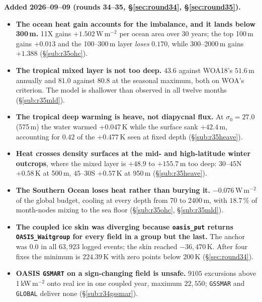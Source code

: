 \documentclass[10pt]{article}
\begin{document}
\textbf{Added 2026--09--09 (rounds 34--35, \S\ref{sec:round34}, \S\ref{sec:round35}).}
\begin{itemize}\itemsep2pt
\item \textbf{The ocean heat gain accounts for the imbalance, and it lands below 300\,m.}
11X gains $+1.502$\,W\,m$^{-2}$ per ocean area over 30 years; the top 100\,m gains
$+0.013$ and the 100--300\,m layer \emph{loses} $0.170$, while 300--2000\,m gains
$+1.388$ (\S\ref{sub:r35ohc}).
\item \textbf{The tropical mixed layer is not too deep.} $43.6$ against WOA18's $51.6$\,m
annually and $81.0$ against $80.8$ at the seasonal maximum, both on WOA's criterion. The
model is shallower than observed in all twelve months (\S\ref{sub:r35mld}).
\item \textbf{The tropical deep warming is heave, not diapycnal flux.} At $\sigma_0=27.0$
(575\,m) the water warmed $+0.047$\,K while the surface sank $+42.4$\,m, accounting for
$0.42$ of the $+0.477$\,K seen at fixed depth (\S\ref{sub:r35heave}).
\item \textbf{Heat crosses density surfaces at the mid- and high-latitude winter
outcrops}, where the mixed layer is $+48.9$ to $+155.7$\,m too deep: $30$--$45$N
$+0.58$\,K at 500\,m, $45$--$30$S $+0.57$\,K at 950\,m (\S\ref{sub:r35heave}).
\item \textbf{The Southern Ocean loses heat rather than burying it.} $-0.076$\,W\,m$^{-2}$
of the global budget, cooling at every depth from 70 to 2400\,m, with $18.7\,\%$ of
month-nodes mixing to the sea floor (\S\ref{sub:r35ohc}, \S\ref{sub:r35mld}).
\item \textbf{The coupled ice skin was diverging because \texttt{oasis\_put} returns
\texttt{OASIS\_Waitgroup} for every field in a group but the last.} The anchor was 0.0 in
all $63{,}923$ logged events; the skin reached $-36{,}470$\,K. After four fixes the
minimum is $224.39$\,K with zero points below 200\,K (\S\ref{sec:round34}).
\item \textbf{OASIS \texttt{GSMART} on a sign-changing field is unsafe.} $9105$ excursions
above 1\,kW\,m$^{-2}$ onto real ice in one coupled year, maximum $22{,}550$;
\texttt{GSSMAR} and \texttt{GLOBAL} deliver none (\S\ref{sub:r34gssmar}).
\end{itemize}
\end{document}
